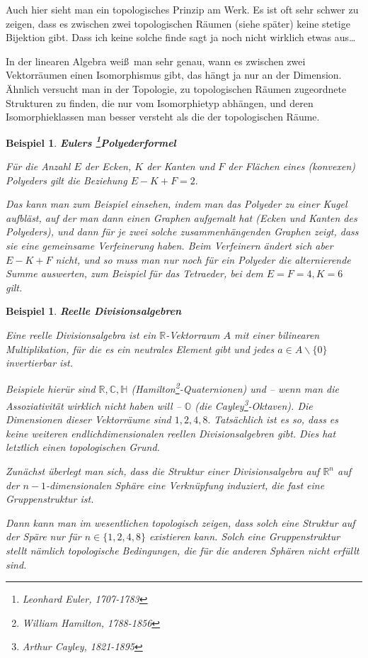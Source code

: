 \documentclass[12pt]{book}   %
\newtheorem{bsp}[alles]{Beispiel}
\begin{document}
Auch hier sieht man ein topologisches Prinzip am Werk. Es ist oft sehr schwer
zu zeigen, dass es zwischen zwei topologischen R\"aumen (siehe sp\"ater) keine
stetige Bijektion gibt. Dass ich keine solche finde sagt ja noch nicht wirklich
etwas aus\dots

In der linearen Algebra wei\ss\  man sehr genau, wann es 
zwischen zwei Vektorr\"aumen einen Isomorphismus gibt, das h\"angt ja nur an 
der Dimension. \"Ahnlich versucht man in der Topologie, zu topologischen 
R\"aumen zugeordnete Strukturen zu finden, die nur vom Isomorphietyp 
abh\"angen, und deren Isomorphieklassen man besser versteht als die der 
topologischen R\"aume.

\begin{bsp} {\bf Eulers \footnote{Leonhard Euler, 1707-1783}Polyederformel}

{\rm F\"ur die Anzahl $E$ der Ecken, $K$ der Kanten und $F$ der Fl\"achen eines
(konvexen) Polyeders gilt die Beziehung $E-K+F=2.$

Das kann man zum Beispiel einsehen, indem man das Polyeder zu einer Kugel 
aufbl\"ast, auf der man dann einen Graphen aufgemalt hat (Ecken und Kanten des 
Polyeders), und dann f\"ur je zwei solche zusammenh\"angenden Graphen zeigt, 
dass sie eine gemeinsame Verfeinerung haben. Beim Verfeinern \"andert sich
aber $E-K+F$ nicht, und so muss man nur noch f\"ur ein Polyeder die 
alternierende Summe auswerten, zum Beispiel f\"ur das Tetraeder, bei dem 
$E=F=4, K=6$ gilt.
}
\end{bsp}

\begin{bsp} {\bf Reelle Divisionsalgebren}

{\rm Eine reelle Divisionsalgebra ist ein $\mathbb R$-Vektorraum $A$ mit einer
bilinearen Multiplikation, f\"ur die es ein neutrales Element gibt und jedes
$a\in A\smallsetminus\{0\}$ invertierbar ist. 

Beispiele hier\"ur sind $\mathbb R,\mathbb C, \mathbb H$ 
(Hamilton\footnote{William Hamilton, 1788-1856}-Quaternionen) und -- wenn man 
die Assoziativit\"at wirklich nicht haben will -- $\mathbb O$ (die 
Cayley\footnote{Arthur Cayley, 1821-1895}-Oktaven). Die Dimensionen dieser 
Vektorr\"aume sind $1,2,4,8.$ Tats\"achlich ist es so, dass es keine weiteren
endlichdimensionalen reellen Divisionsalgebren gibt. Dies
hat letztlich einen topologischen Grund. 

Zun\"achst \"uberlegt man sich, dass die Struktur einer Divisionsalgebra auf 
$\mathbb R^n$ auf der $n-1$-dimensionalen Sph\"are eine Verkn\"upfung
induziert, die fast eine Gruppenstruktur ist.

Dann kann man im wesentlichen topologisch zeigen, dass solch eine Struktur
auf der Sp\"are nur f\"ur
$n\in\{1,2,4,8\}$ existieren kann. Solch eine Gruppenstruktur stellt n\"amlich 
topologische Bedingungen, die f\"ur die anderen Sph\"aren nicht erf\"ullt sind.
}\end{bsp}
\end{document}
